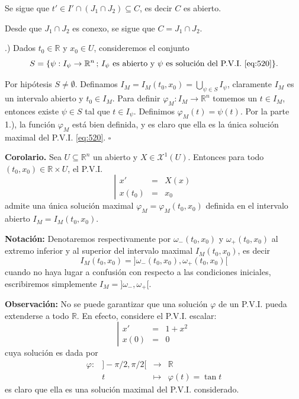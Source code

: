 \documentclass[11pt,a4paper]{article}
\theoremstyle{definition}
\theoremstyle{plain}
\theoremstyle{remark}
\begin{document}
	Se sigue que $t' \in I' \cap (J_1 \cap J_2) \subseteq C$, es decir $C$ es abierto.
	
	Desde que $J_1 \cap J_2$ es conexo, se sigue que $C = J_1 \cap J_2$.
	
	.) Dados $t_0 \in \mathbb{R}$ y $x_0 \in U$, consideremos el conjunto
	\[
	S = \{\psi : I_\psi \to \mathbb{R}^n \,;\, I_\psi \text{ es abierto y } \psi \text{ es solución del P.V.I. } \eqref{eq:520}\}.
	\]
	
	Por hipótesis $S \neq \emptyset$. Definamos $I_M = I_M(t_0, x_0) = \bigcup_{\psi \in S} I_\psi$, claramente $I_M$ es un intervalo abierto y $t_0 \in I_M$. Para definir $\varphi_M : I_M \to \mathbb{R}^n$ tomemos un $t \in I_M$, entonces existe $\psi \in S$ tal que $t \in I_\psi$. Definimos $\varphi_M(t) = \psi(t)$. Por la parte 1.), la función $\varphi_M$ está bien definida, y es claro que ella es la única solución maximal del P.V.I. \eqref{eq:520}. \hfill $\square$
	
	\noindent \textbf{Corolario.} Sea $U \subseteq \mathbb{R}^n$ un abierto y $X \in \mathcal{X}^1(U)$. Entonces para todo $(t_0, x_0) \in \mathbb{R} \times U$, el P.V.I.
	\begin{equation*}
		\left| 
		\begin{array}{lcl}
			x' &=& X(x) \\
			x(t_0) &=& x_0
		\end{array}
		\right.
	\end{equation*}
	admite una única solución maximal $\varphi_M = \varphi_M(t_0, x_0)$ definida en el intervalo abierto $I_M = I_M(t_0, x_0)$.
	
	\noindent \textbf{Notación:} Denotaremos respectivamente por $\omega_-(t_0, x_0)$ y $\omega_+(t_0, x_0)$ al extremo inferior y al superior del intervalo maximal $I_M(t_0, x_0)$, es decir
	\[
	I_M(t_0, x_0) = {]\omega_-(t_0, x_0), \omega_+(t_0, x_0)[}
	\]
	cuando no haya lugar a confusión con respecto a las condiciones iniciales, escribiremos simplemente $I_M = {]\omega_-, \omega_+[}$.
	
	\noindent \textbf{Observación:} No se puede garantizar que una solución $\varphi$ de un P.V.I. pueda extenderse a todo $\mathbb{R}$. En efecto, considere el P.V.I. escalar:
	\begin{equation*}
		\left| 
		\begin{array}{lcl}
			x' &=& 1 + x^2 \\
			x(0) &=& 0
		\end{array}
		\right.
	\end{equation*}
	cuya solución es dada por
	\[
	\begin{array}{rcccl}
		\varphi : & {]-\pi/2, \pi/2[} &\to& \mathbb{R} \\
		& t &\mapsto& \varphi(t) = \tan t
	\end{array}
	\]
	es claro que ella es una solución maximal del P.V.I. considerado.
	
\end{document}
